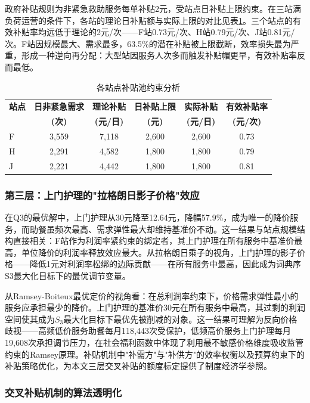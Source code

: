 政府补贴规则为非紧急救助服务每单补贴2元，受站点日补贴上限约束。在三站满负荷运营的条件下，各站的理论日补贴额与实际上限的对比见表\ref{tab:q3_subsidy}。三个站点的有效补贴率均远低于理论的2元/次——F站0.73元/次、H站0.79元/次、J站0.81元/次。F站因规模最大、需求最多，63.5\%的潜在补贴被上限截断，效率损失最为严重，形成一种逆向再分配：大型站因服务人次多而触发补贴帽更早，有效补贴率反而最低。

\begin{table}[htbp]
\centering
\caption{各站点补贴池约束分析}
\label{tab:q3_subsidy}
\small
\begin{tabular}{lccccc}
\toprule
\textbf{站点} & \textbf{日非紧急需求} & \textbf{理论补贴} & \textbf{日补贴上限} & \textbf{实际补贴} & \textbf{有效补贴率} \\
 & \textbf{(次)} & \textbf{(元/日)} & \textbf{(元)} & \textbf{(元/日)} & \textbf{(元/次)} \\
\midrule
F & 3,559 & 7,118 & 2,600 & 2,600 & 0.73 \\
H & 2,291 & 4,582 & 1,800 & 1,800 & 0.79 \\
J & 2,221 & 4,442 & 1,800 & 1,800 & 0.81 \\
\bottomrule
\end{tabular}
\end{table}

\subsubsection{第三层：上门护理的"拉格朗日影子价格"效应}

在Q3的最优解中，上门护理从30元降至12.64元，降幅57.9\%，成为唯一的降价服务，而助餐虽频次最高、需求弹性最大却维持基准价不动。这一结果与站点规模结构直接相关：F站作为利润率紧约束的绑定者，其上门护理在所有服务中基准价最高，单位降价的利润率释放效应最大。从拉格朗日乘子的视角，上门护理的影子价格——降低1元对利润率松绑的边际贡献——在所有服务中最高，因此成为词典序S3最大化目标下的最优调节变量。

从Ramsey-Boiteux最优定价的视角看：在总利润率约束下，价格需求弹性最小的服务应承担最少的降价。上门护理的基准价30元在所有服务中最高，其过剩的利润空间使其成为$S_3$最大化目标下最优先被削减的对象。这一结果可理解为反向价格歧视——高频低价服务助餐每月118,443次受保护，低频高价服务上门护理每月19,608次承担调节压力，在社会福利函数中体现了利用最不敏感价格维度吸收监管约束的Ramsey原理\cite{ramsey1927}。补贴机制中"补需方"与"补供方"的效率权衡以及预算约束下的补贴策略优化，为本文三层交叉补贴的额度标定提供了制度经济学参照。

\subsubsection{交叉补贴机制的算法透明化}

